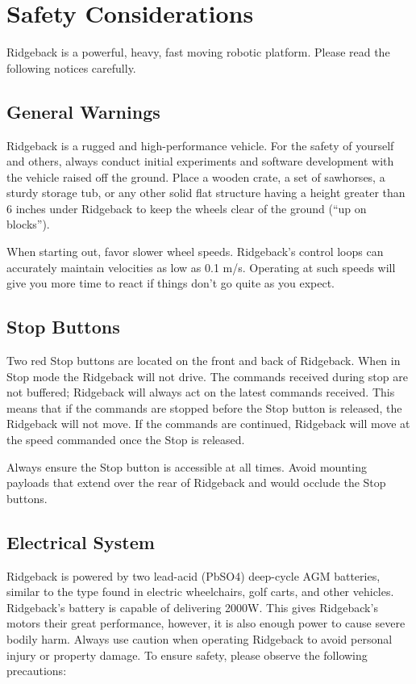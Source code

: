 \documentclass[]{clearpath-latex/clearpath-manual}
\begin{document}
\section{Safety Considerations}

Ridgeback is a powerful, heavy, fast moving robotic platform. Please read the following notices carefully.

\subsection{General Warnings}

Ridgeback is a rugged and high-performance vehicle. For the safety of yourself and others, always conduct initial experiments and software development with the vehicle raised off the ground. Place a wooden crate, a set of sawhorses, a sturdy storage tub, or any other solid flat structure having a height greater than 6 inches under Ridgeback to keep the wheels clear of the ground (“up on blocks”).

When starting out, favor slower wheel speeds. Ridgeback's control loops can accurately maintain velocities as low as 0.1 m/s. Operating at such speeds will give you more time to react if things don’t go quite as you expect.

\subsection{Stop Buttons}

Two red Stop buttons are located on the front and back of Ridgeback. When in Stop mode the Ridgeback will not drive. The commands received during stop are not buffered; Ridgeback will always act on the latest commands received. This means that if the commands are stopped before the Stop button is released, the Ridgeback will not move. If the commands are continued, Ridgeback will move at the speed commanded once the Stop is released.

Always ensure the Stop button is accessible at all times. Avoid mounting payloads that extend over the rear of Ridgeback and would occlude the Stop buttons.

\subsection{Electrical System}

Ridgeback is powered by two lead-acid (PbSO4) deep-cycle AGM batteries, similar to the type found in electric wheelchairs, golf carts, and other vehicles. Ridgeback's battery is capable of delivering 2000W. This gives Ridgeback's motors their great performance, however, it is also enough power to cause severe bodily harm. Always use caution when operating Ridgeback to avoid personal injury or property damage.  To ensure safety, please observe the following precautions:
\end{document}
